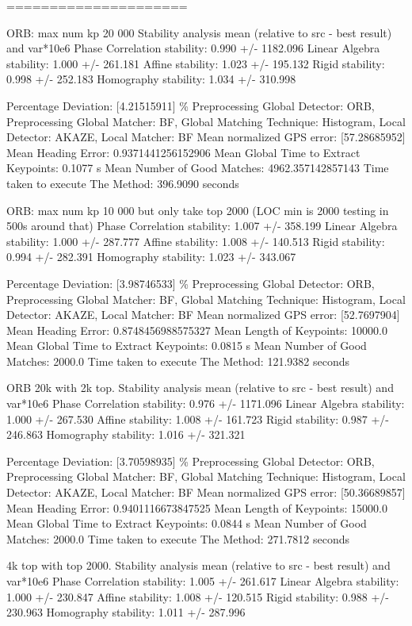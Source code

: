 \begin{itemize}
=====================

ORB: max num kp 20 000
Stability analysis mean (relative to src - best result) and var*10e6
Phase Correlation stability: 0.990 +/- 1182.096
Linear Algebra stability: 1.000 +/- 261.181
Affine stability: 1.023 +/- 195.132
Rigid stability: 0.998 +/- 252.183
Homography stability: 1.034 +/- 310.998

Percentage Deviation: [4.21515911] \%
Preprocessing Global Detector: ORB, Preprocessing Global Matcher: BF, Global Matching Technique: Histogram, Local Detector: AKAZE, Local Matcher: BF
Mean normalized GPS error: [57.28685952]
 Mean Heading Error: 0.9371441256152906 
Mean Global Time to Extract Keypoints: 0.1077 s
Mean Number of Good Matches: 4962.357142857143
Time taken to execute The Method: 396.9090 seconds


ORB: max num kp 10 000 but only take top 2000 (LOC min is 2000 testing in 500s around that)
Phase Correlation stability: 1.007 +/- 358.199
Linear Algebra stability: 1.000 +/- 287.777
Affine stability: 1.008 +/- 140.513
Rigid stability: 0.994 +/- 282.391
Homography stability: 1.023 +/- 343.067

Percentage Deviation: [3.98746533] \%
Preprocessing Global Detector: ORB, Preprocessing Global Matcher: BF, Global Matching Technique: Histogram, Local Detector: AKAZE, Local Matcher: BF
Mean normalized GPS error: [52.7697904]
 Mean Heading Error: 0.8748456988575327
Mean Length of Keypoints: 10000.0
Mean Global Time to Extract Keypoints: 0.0815 s
Mean Number of Good Matches: 2000.0
Time taken to execute The Method: 121.9382 seconds


ORB 20k with 2k top. 
Stability analysis mean (relative to src - best result) and var*10e6
Phase Correlation stability: 0.976 +/- 1171.096
Linear Algebra stability: 1.000 +/- 267.530
Affine stability: 1.008 +/- 161.723
Rigid stability: 0.987 +/- 246.863
Homography stability: 1.016 +/- 321.321

Percentage Deviation: [3.70598935] \%
Preprocessing Global Detector: ORB, Preprocessing Global Matcher: BF, Global Matching Technique: Histogram, Local Detector: AKAZE, Local Matcher: BF
Mean normalized GPS error: [50.36689857]
 Mean Heading Error: 0.9401116673847525
Mean Length of Keypoints: 15000.0
Mean Global Time to Extract Keypoints: 0.0844 s
Mean Number of Good Matches: 2000.0
Time taken to execute The Method: 271.7812 seconds


4k top with top 2000. 
Stability analysis mean (relative to src - best result) and var*10e6
Phase Correlation stability: 1.005 +/- 261.617
Linear Algebra stability: 1.000 +/- 230.847
Affine stability: 1.008 +/- 120.515
Rigid stability: 0.988 +/- 230.963
Homography stability: 1.011 +/- 287.996


\end{itemize}
